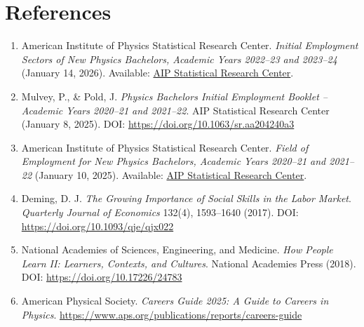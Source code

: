 \documentclass[11pt]{article}
\begin{document}
\section*{References}
\begingroup
\small
\begin{enumerate}[leftmargin=1.4em,itemsep=0.35em]
  \item American Institute of Physics Statistical Research Center. \textit{Initial Employment Sectors of New Physics Bachelors, Academic Years 2022--23 and 2023--24} (January 14, 2026). Available: \href{https://www.aip.org/statistics/initial-employment-sectors-of-new-physics-bachelors-academic-years-2022-23-and-2023-24}{AIP Statistical Research Center}.
  \item Mulvey, P., \& Pold, J. \textit{Physics Bachelors Initial Employment Booklet -- Academic Years 2020--21 and 2021--22}. AIP Statistical Research Center (January 8, 2025). DOI: \url{https://doi.org/10.1063/sr.aa204240a3}
  \item American Institute of Physics Statistical Research Center. \textit{Field of Employment for New Physics Bachelors, Academic Years 2020--21 and 2021--22} (January 10, 2025). Available: \href{https://www.aip.org/statistics/field-of-employment-for-new-physics-bachelors-academic-years-2020-21-and-2021-22}{AIP Statistical Research Center}.
  \item Deming, D. J. \textit{The Growing Importance of Social Skills in the Labor Market}. \textit{Quarterly Journal of Economics} 132(4), 1593--1640 (2017). DOI: \url{https://doi.org/10.1093/qje/qjx022}
  \item National Academies of Sciences, Engineering, and Medicine. \textit{How People Learn II: Learners, Contexts, and Cultures}. National Academies Press (2018). DOI: \url{https://doi.org/10.17226/24783}
  \item American Physical Society. \textit{Careers Guide 2025: A Guide to Careers in Physics}. \url{https://www.aps.org/publications/reports/careers-guide}
\end{enumerate}
\endgroup
\end{document}
